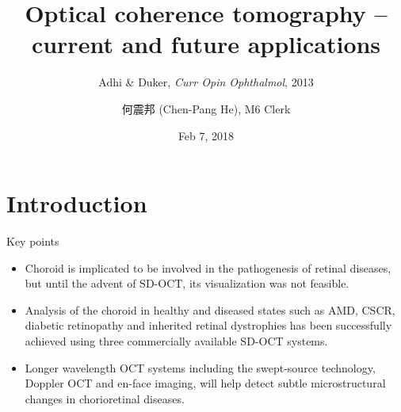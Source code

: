\documentclass{beamer}
\title[OCT (Adhi \& Duker)]{Optical coherence tomography -- current and future applications}
\subtitle{Adhi \& Duker, \textit{Curr Opin Ophthalmol}, 2013}
\author[Chen-Pang He]{何震邦 (Chen-Pang He), M6 Clerk}
\date{Feb 7, 2018}
\institute[TMUH]
{
    Department of Ophthalmology\\
    Taipei Medical University Hospital
}
\begin{document}
\maketitle

\section{Introduction}
\begin{frame}{Key points}
    \begin{itemize}
        \item Choroid is implicated to be involved in the pathogenesis of
            retinal diseases, but until the advent of SD-OCT, its visualization
            was not feasible.
        \item Analysis of the choroid in healthy and diseased states such as
            AMD, CSCR, diabetic retinopathy and inherited retinal dystrophies
            has been successfully achieved using three commercially available
            SD-OCT systems.
        \item Longer wavelength OCT systems including the swept-source
            technology, Doppler OCT and en-face imaging, will help detect
            subtle microstructural changes in chorioretinal diseases.
    \end{itemize}
\end{frame}
\end{document}
